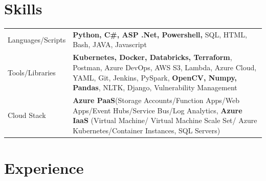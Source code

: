 \documentclass[a4paper,3pt]{article}
\begin{document}
\section{Skills}
\begin{tabularx}{\linewidth}{@{}l X@{}}
    Languages/Scripts & \normalsize{\textbf{Python, C\#, ASP .Net, Powershell,} SQL, HTML, Bash, JAVA, Javascript}\\
    Tools/Libraries   & \normalsize{\textbf{Kubernetes, Docker, Databricks, Terraform}, Postman, Azure DevOps, AWS S3, Lambda, Azure Cloud, YAML, Git, Jenkins, PySpark, \textbf{OpenCV, Numpy, Pandas}, NLTK, Django, Vulnerability Management}\\
    Cloud Stack       & \normalsize{\textbf{Azure PaaS}(Storage Accounts/Function Apps/Web Apps/Event Hubs/Service Bus/Log Analytics}, \textbf{Azure IaaS} (Virtual Machine/ Virtual Machine Scale Set/ Azure Kubernetes/Container Instances, SQL Servers)
\end{tabularx}


\section{Experience}
\end{document}
